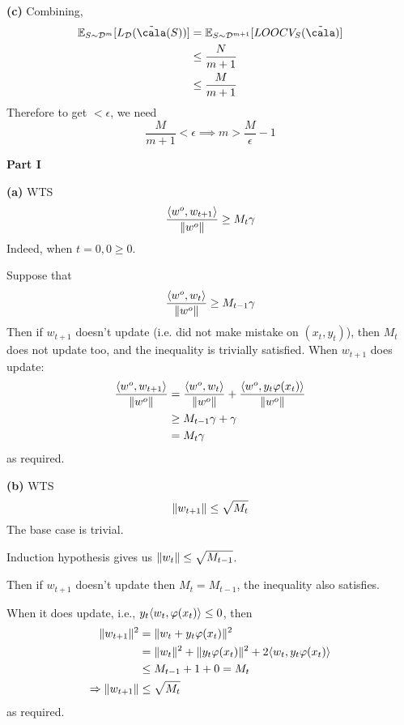 \documentclass[a4paper, 12pt]{article}
\begin{document}
\textbf{(c)} 
Combining, \begin{align*}
    \bbe_{S \sim \cald^m} [L_\cald (\tcala(S))] &= \bbe_{S \sim \cald^{m+1}} [LOOCV_S(\tcala)] \\
    &\leq \frac{N}{m+1} \\
    &\leq \frac{M}{m+1}
\end{align*}
Therefore to get $< \epsilon$, we need \begin{equation*}
    \frac{M}{m+1} < \epsilon \implies m > \frac{M}{\epsilon} - 1
\end{equation*}
\begin{problem} [Problem 2]

    \textbf{Part I}

    \textbf{(a)} WTS 
    \begin{equation*}
        \frac{\langle w^o, w_{t+1} \rangle}{\lVert w^o\rVert} \geq M_t \gamma
    \end{equation*}
    Indeed, when $t = 0, 0 \geq 0$.

    Suppose that \begin{equation*}
        \frac{\langle w^o, w_{t} \rangle}{\lVert w^o\rVert} \geq M_{t-1} \gamma
    \end{equation*}
    Then if $w_{t+1}$ doesn't update (i.e. did not make mistake on $(x_t, y_t)$), then $M_t$ does not update too, and the inequality is trivially satisfied. When $w_{t+1}$ does update:
    \begin{align*}
        \frac{\langle w^o, w_{t+1} \rangle}{\lVert w^o\rVert} &=  \frac{\langle w^o, w_{t} \rangle}{\lVert w^o\rVert} +  \frac{\langle w^o, y_t \varphi(x_t) \rangle}{\lVert w^o\rVert} \\
        &\geq M_{t-1}\gamma + \gamma \\
        &= M_t \gamma
    \end{align*}
    as required.

    \textbf{(b)} WTS 
    \begin{equation*}
        \lVert w_{t+1}\rVert \leq \sqrt{M_t}
    \end{equation*}
    The base case is trivial.

    Induction hypothesis gives us $\lVert w_{t}\rVert \leq \sqrt{M_{t-1}}$.

    Then if $w_{t+1}$ doesn't update then $M_t = M_{t-1}$, the inequality also satisfies.

    When it does update, i.e., $y_t \langle w_t, \varphi(x_t) \rangle \leq 0$, then \begin{align*}
        \lVert w_{t+1}\rVert^2 &= \lVert w_t + y_t \varphi(x_t)\rVert^2 \\
        &= \lVert w_t\rVert^2 + \lVert y_t \varphi(x_t)\rVert^2 + 2 \langle w_t, y_t \varphi(x_t) \rangle  \\
        &\leq M_{t-1} + 1  + 0 = M_t  \\
        \Rightarrow \lVert w_{t+1}\rVert & \leq \sqrt{M_t}
    \end{align*}
    as required.


\end{problem}
\end{document}
